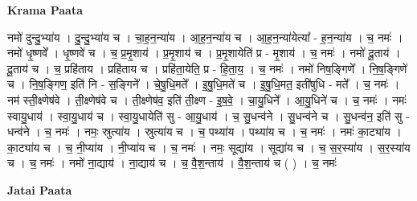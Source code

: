 \documentclass[17pt]{extarticle}
\begin{document}
\textbf{Krama Paata} \newline

नमो॑ दुन्दु॒भ्या॑य । दु॒न्दु॒भ्या॑य च । चा॒ह॒न॒न्या॑य । आ॒ह॒न॒न्या॑य च । आ॒ह॒न॒न्या॑येत्या᳚ - ह॒न॒न्या॑य । च॒ नमः॑ । नमो॑ धृ॒ष्णवे᳚ । धृ॒ष्णवे॑ च । च॒ प्र॒मृ॒शाय॑ । प्र॒मृ॒शाय॑ च । प्र॒मृ॒शायेति॑ प्र - मृ॒शाय॑ । च॒ नमः॑ । नमो॑ दू॒ताय॑ । दू॒ताय॑ च । च॒ प्रहि॑ताय । प्रहि॑ताय च । प्रहि॑ता॒येति॒ प्र - हि॒ता॒य॒ । च॒ नमः॑ । नमो॑ निष॒ङ्गिणे᳚ । नि॒ष॒ङ्गिणे॑ च । नि॒ष॒ङ्गिण॒ इति॑ नि - स॒ङ्गिने᳚ । चे॒षु॒धि॒मते᳚ । इ॒षु॒धि॒मते॑ च । इ॒षु॒धि॒मत॒ इती॑षुधि - मते᳚ । च॒ नमः॑ । नम॑ स्ती॒क्ष्णेष॑वे । ती॒क्ष्णेष॑वे च । ती॒क्ष्णेष॑व॒ इति॑ ती॒क्ष्ण - इ॒ष॒वे॒ । चा॒यु॒धिने᳚ । आ॒यु॒धिने॑ च । च॒ नमः॑ । नमः॑ स्वायु॒धाय॑ । स्वा॒यु॒धाय॑ च । स्वा॒यु॒धायेति॑ सु - आ॒यु॒धाय॑ । च॒ सु॒धन्व॑ने । सु॒धन्व॑ने च । सु॒धन्व॑न॒ इति॑ सु - धन्व॑ने । च॒ नमः॑ । नमः॒ स्रुत्या॑य । स्रुत्या॑य च । च॒ पथ्या॑य । पथ्या॑य च । च॒ नमः॑ । नमः॑ का॒ट्या॑य । का॒ट्या॑य च । च॒ नी॒प्या॑य । नी॒प्या॑य च । च॒ नमः॑ । नमः॒ सूद्या॑य । सूद्या॑य च । च॒ स॒र॒स्या॑य । स॒र॒स्या॑य च । च॒ नमः॑ । नमो॑ ना॒द्याय॑ । ना॒द्याय॑ च । च॒ वै॒श॒न्ताय॑ । वै॒श॒न्ताय॑ च ( ) । च॒ नमः॑ \newline

\textbf{Jatai Paata} \newline
\end{document}
